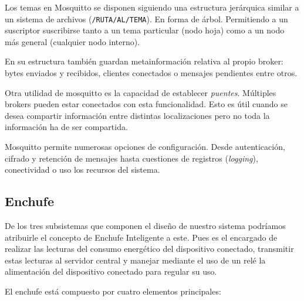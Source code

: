 \documentclass[a4paper,10pt]{article}
\begin{document}
Los temas en Mosquitto se disponen siguiendo una estructura jerárquica
similar a un sistema de archivos (\texttt{/RUTA/AL/TEMA}). En forma de
árbol. Permitiendo a un suscriptor suscribirse tanto a un tema
particular (nodo hoja) como a un nodo más general (cualquier nodo
interno).

En su estructura también guardan metainformación relativa al propio
broker: bytes enviados y recibidos, clientes conectados o mensajes
pendientes entre otros.

Otra utilidad de mosquitto es la capacidad de establecer
\textit{puentes}. Múltiples brokers pueden estar conectados con esta
funcionalidad. Esto es útil cuando se desea compartir información
entre distintas localizaciones pero no toda la información ha de ser
compartida.

Mosquitto permite numerosas opciones de configuración. Desde
autenticación, cifrado y retención de mensajes hasta cuestiones de registros
(\textit{logging}), conectividad o uso los recursos del sistema.


\newpage

\subsection{Enchufe}\label{subsec:enchufe}

De los tres subsistemas que componen el diseño de nuestro sistema
podríamos atribuirle el concepto de Enchufe Inteligente a este. Pues
es el encargado de realizar las lecturas del consumo energético del
dispositivo conectado, transmitir estas lecturas al servidor central y
manejar mediante el uso de un relé la alimentación del dispositivo
conectado para regular su uso.

El enchufe está compuesto por cuatro elementos principales:
\end{document}
